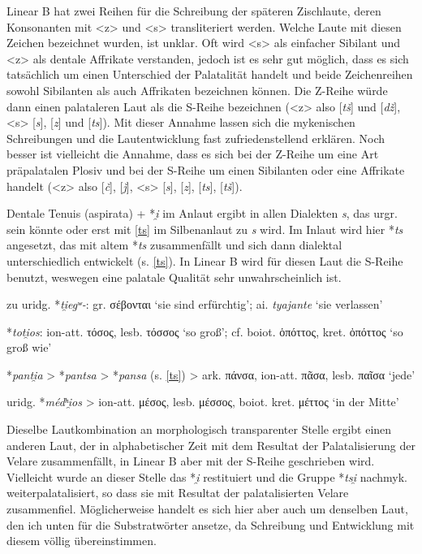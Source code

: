 \documentclass[12pt,a4paper,normalheadings,bibliography=totoc]{scrartcl}
\def\rek#1{\mbox{*\textit{#1}}}
\def\bel#1{\mbox{\textit{#1}}}
\def\i#1{\mbox{\textit{#1}}}
\begin{document}
Linear B hat zwei Reihen für die Schreibung der späteren Zischlaute,
deren Konsonanten mit <z> und <s> transliteriert werden.
Welche Laute mit diesen Zeichen bezeichnet wurden, ist unklar.
Oft wird <s> als einfacher Sibilant und <z> als dentale Affrikate verstanden,
jedoch ist es sehr gut möglich,
dass es sich tatsächlich um einen Unterschied der Palatalität handelt
und beide Zeichenreihen sowohl Sibilanten als auch Affrikaten bezeichnen können.
Die Z-Reihe würde dann einen palataleren Laut als die S-Reihe bezeichnen
(<z> also [\bel{tš}] und [\bel{dž}], <s> [\bel{s}], [\bel{z}] und [\bel{ts}]).
Mit dieser Annahme lassen sich die mykenischen Schreibungen
und die Lautentwicklung fast zufriedenstellend erklären.
Noch besser ist vielleicht die Annahme,
dass es sich bei der Z-Reihe um eine Art präpalatalen Plosiv
und bei der S-Reihe um einen Sibilanten oder eine Affrikate handelt
(<z> also [\bel{č}], [\bel{ǰ}], <s> [\bel{s}], [\bel{z}], [\bel{ts}], [\bel{tš}]).

Dentale Tenuis (aspirata) + \rek{i̯} im Anlaut ergibt in allen Dialekten \bel{s},
das urgr. sein könnte oder erst mit \ref{ts} im Silbenanlaut zu \bel{s} wird.
Im Inlaut wird hier \rek{ts} angesetzt, das mit altem \rek{ts} zusammenfällt
und sich dann dialektal unterschiedlich entwickelt (s. \ref{ts}).
In Linear B wird für diesen Laut die S-Reihe benutzt,
weswegen eine palatale Qualität sehr unwahrscheinlich ist.

\lex{(\i{t}, \i{tʰ})\i{i̯}}{\i{s}}{\#\_}

zu uridg. \rek{ti̯egʷ-}: gr. σέβονται `sie sind erfürchtig'; ai. \bel{tyajante} `sie verlassen'

\lex{(\i{t}, \i{tʰ})\i{i̯}}{\i{ts}}{\_}

\rek{toti̯os}: ion-att. τόσος, lesb. τόσσος `so groß'; cf. boiot. ὁπόττος, kret. ὀπόττος `so groß wie'

\rek{panti̯a} > \rek{pantsa} > \rek{pansa} (s. \ref{ts}) >
ark. πάνσα, ion-att. πᾶσα, lesb. παῖσα `jede'

uridg. \rek{médʰi̯os} > ion-att. μέσος, lesb. μέσσος, boiot. kret. μέττος `in der Mitte'

\bigskip\noindent
Dieselbe Lautkombination an morphologisch transparenter Stelle
ergibt einen anderen Laut,
der in alphabetischer Zeit mit dem Resultat der Palatalisierung der
Velare zusammenfällt,
in Linear B aber mit der S-Reihe geschrieben wird.
Vielleicht wurde an dieser Stelle das \rek{i̯} restituiert
und die Gruppe \rek{tsi̯} nachmyk. weiterpalatalisiert,
so dass sie mit Resultat der palatalisierten Velare zusammenfiel.
Möglicherweise handelt es sich hier aber auch um denselben Laut,
den ich unten für die Substratwörter ansetze,
da Schreibung und Entwicklung mit diesem völlig übereinstimmen.
\end{document}
